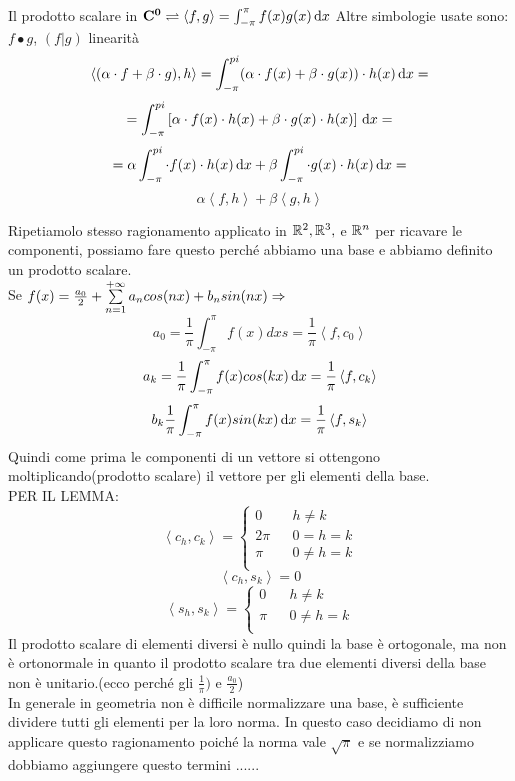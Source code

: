 Il prodotto scalare in $\mathbf{C^{0}} \rightleftharpoons \left<f,g\right>=\int_{-\pi}^{\pi}f(x)g(x)\,\mathrm{d}{x}$
Altre simbologie usate sono: $ f\bullet g $, $(f|g)$
\observation linearità\\
\[\left<(\alpha\cdot f+\beta\cdot g), h \right>= \int_{-\pi}^{pi} (\alpha\cdot f(x)+\beta\cdot g(x))\cdot h(x) \,\mathrm{d}{x}=\]
\[=\int_{-\pi}^{pi} \left[\alpha\cdot f(x)\cdot h(x)+\beta\cdot g(x)\cdot h(x) \right]\,\mathrm{d}{x}= \]
\[=\alpha\int_{-\pi}^{pi} \cdot f(x)\cdot h(x) \,\mathrm{d}{x}+\beta\int_{-\pi}^{pi} \cdot g(x)\cdot h(x) \,\mathrm{d}{x} =\]
\[\alpha\left<f,h\right>+\beta\left<g,h\right>\]

Ripetiamolo stesso ragionamento applicato in $ \mathbb{R}^2, \mathbb{R}^3,$ e $ \mathbb{R}^n$ per ricavare le componenti, possiamo fare questo perché abbiamo una base e abbiamo definito un prodotto scalare.\\
Se $f(x)=\frac{a_0}{2}+\sum\limits_{n=1}^{+\infty}a_{n}cos(nx)+b_{n}sin(nx) \Rightarrow $
\[a_0=\frac{1}{\pi}\int_{-\pi}^{\pi}f(x)dxs=\frac{1}{\pi}\left<f,c_0\right> \]
\[a_k=\frac{1}{\pi}\int_{-\pi}^{\pi}f(x)cos(kx)\,\mathrm{d}{x}=\frac{1}{\pi}\left<f,c_k\right> \]
\[b_k\frac{1}{\pi}\int_{-\pi}^{\pi}f(x)sin(kx)\,\mathrm{d}{x}=\frac{1}{\pi}\left<f,s_k\right>\]
Quindi come prima le componenti di un vettore si ottengono moltiplicando(prodotto scalare) il vettore per gli elementi della base.\\
PER IL LEMMA:\\
\[
\left<c_h,c_k\right>=
\left\{\begin{matrix}
0&&h\ne k\\
2\pi&&0=h=k\\
\pi&&0\ne h=k\\
\end{matrix}\right.
\]
\[ \left<c_h,s_k\right>=0\]
\[
\left<s_h,s_k\right>=
\left\{\begin{matrix}
0&&h\ne k\\
\pi&&0\ne h=k\\
\end{matrix}\right.
\]
Il prodotto scalare di elementi diversi è nullo quindi la base è ortogonale, ma non è ortonormale in quanto il prodotto scalare tra due elementi diversi della base non è unitario.(ecco perché gli $\frac{1}{\pi})$ e $\frac{a_0}{2}$)\\
In generale in geometria non è difficile normalizzare una base, è sufficiente dividere tutti gli elementi per la loro norma. In questo caso decidiamo di non applicare questo ragionamento poiché la norma vale $\sqrt{\pi}$ e se normalizziamo dobbiamo aggiungere questo termini ......\\
